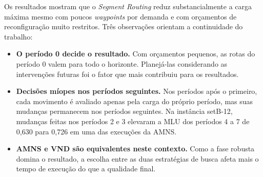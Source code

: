 Os resultados mostram que o \textit{Segment Routing} reduz substancialmente a carga máxima mesmo com poucos \textit{waypoints} por demanda e com orçamentos de reconfiguração muito restritos. Três observações orientam a continuidade do trabalho:

\begin{itemize}
    \item \textbf{O período 0 decide o resultado.} Com orçamentos pequenos, as rotas do período 0 valem para todo o horizonte. Planejá-las considerando as intervenções futuras foi o fator que mais contribuiu para os resultados.
    \item \textbf{Decisões míopes nos períodos seguintes.} Nos períodos após o primeiro, cada movimento é avaliado apenas pela carga do próprio período, mas suas mudanças permanecem nos períodos seguintes. Na instância setB-12, mudanças feitas nos períodos 2 e 3 elevaram a MLU dos períodos 4 a 7 de 0,630 para 0,726 em uma das execuções da AMNS.
    \item \textbf{AMNS e VND são equivalentes neste contexto.} Como a fase robusta domina o resultado, a escolha entre as duas estratégias de busca afeta mais o tempo de execução do que a qualidade final.
\end{itemize}
